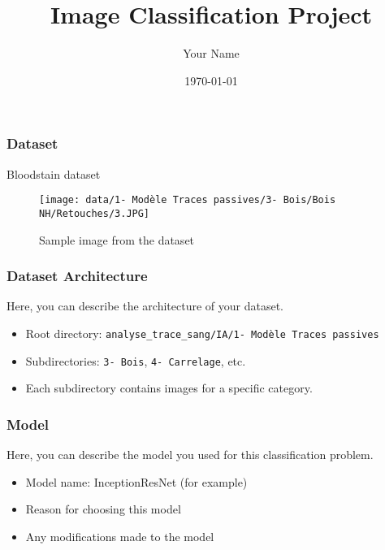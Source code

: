 \documentclass{beamer}
\title{Image Classification Project}
\author{Your Name}
\date{\today}
\begin{document}
\frame{\titlepage}

\begin{frame}
    \frametitle{Dataset}
    Bloodstain dataset
    \begin{figure}
        \texttt{[image: data/1- Modèle Traces passives/3- Bois/Bois NH/Retouches/3.JPG]}
        \caption{Sample image from the dataset}
    \end{figure}
\end{frame}

\begin{frame}
\frametitle{Dataset Architecture}
Here, you can describe the architecture of your dataset.
\begin{itemize}
\item Root directory: \texttt{analyse\_trace\_sang/IA/1- Modèle Traces passives}
\item Subdirectories: \texttt{3- Bois}, \texttt{4- Carrelage}, etc.
\item Each subdirectory contains images for a specific category.
\end{itemize}
\end{frame}

\begin{frame}
\frametitle{Model}
Here, you can describe the model you used for this classification problem.
\begin{itemize}
\item Model name: InceptionResNet (for example)
\item Reason for choosing this model
\item Any modifications made to the model
\end{itemize}
\end{frame}
\end{document}
